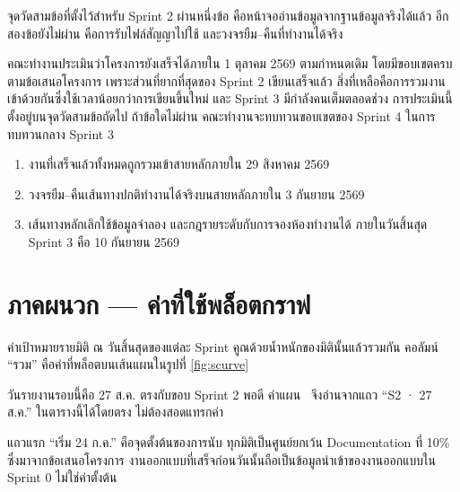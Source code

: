 จุดวัดสามข้อที่ตั้งไว้สำหรับ Sprint 2 ผ่านหนึ่งข้อ คือหน้าจออ่านข้อมูลจากฐานข้อมูลจริงได้แล้ว อีกสองข้อยังไม่ผ่าน คือการรับไฟล์สัญญาไปใช้ และวงจรยืม–คืนที่ทำงานได้จริง

คณะทำงานประเมินว่าโครงการยังเสร็จได้ภายใน 1 ตุลาคม 2569 ตามกำหนดเดิม โดยมีขอบเขตครบตามข้อเสนอโครงการ เพราะส่วนที่ยากที่สุดของ Sprint 2 เขียนเสร็จแล้ว สิ่งที่เหลือคือการรวมงานเข้าด้วยกันซึ่งใช้เวลาน้อยกว่าการเขียนขึ้นใหม่ และ Sprint 3 มีกำลังคนเต็มตลอดช่วง การประเมินนี้ตั้งอยู่บนจุดวัดสามข้อถัดไป ถ้าข้อใดไม่ผ่าน คณะทำงานจะทบทวนขอบเขตของ Sprint 4 ในการทบทวนกลาง Sprint 3

\begin{enumerate}
  \item งานที่เสร็จแล้วทั้งหมดถูกรวมเข้าสายหลักภายใน 29 สิงหาคม 2569
  \item วงจรยืม–คืนเส้นทางปกติทำงานได้จริงบนสายหลักภายใน 3 กันยายน 2569
  \item เส้นทางหลักเลิกใช้ข้อมูลจำลอง และกฎรายระดับกับการจองห้องทำงานได้ ภายในวันสิ้นสุด Sprint 3 คือ 10 กันยายน 2569
\end{enumerate}


\section*{ภาคผนวก — ค่าที่ใช้พล็อตกราฟ}

ค่าเป้าหมายรายมิติ ณ วันสิ้นสุดของแต่ละ Sprint คูณด้วยน้ำหนักของมิตินั้นแล้วรวมกัน คอลัมน์ ``รวม'' คือค่าที่พล็อตบนเส้นแผนในรูปที่ \ref{fig:scurve}

วันรายงานรอบนี้คือ 27 ส.ค. ตรงกับขอบ Sprint 2 พอดี ค่าแผน \planpct\ จึงอ่านจากแถว ``S2 · 27 ส.ค.'' ในตารางนี้ได้โดยตรง ไม่ต้องสอดแทรกค่า

แถวแรก ``เริ่ม 24 ก.ค.'' คือจุดตั้งต้นของการนับ ทุกมิติเป็นศูนย์ยกเว้น Documentation ที่ 10\% ซึ่งมาจากข้อเสนอโครงการ งานออกแบบที่เสร็จก่อนวันนั้นถือเป็นข้อมูลนำเข้าของงานออกแบบใน Sprint 0 ไม่ใช่ค่าตั้งต้น

